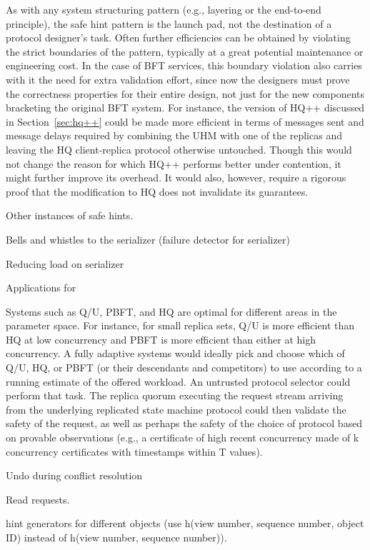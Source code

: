 \documentclass[twocolumn,10pt]{article}
\begin{document}
 As with any system structuring pattern
(e.g., layering or the end-to-end principle), the safe hint pattern is
the launch pad, not the destination of a protocol designer's task.
Often further efficiencies can be obtained by violating the strict
boundaries of the pattern, typically at a great potential maintenance or
engineering cost.  In the case of BFT services, this boundary violation
also carries with it the need for extra validation effort, since now the
designers must prove the correctness properties for their entire design,
not just for the new components bracketing the original BFT system.  For
instance, the version of HQ++ discussed in Section~\ref{sec:hq++} could
be made more efficient in terms of messages sent and message delays
required by combining the UHM with one of the replicas and leaving the
HQ client-replica protocol otherwise untouched.  Though this would not
change the reason for which HQ++ performs better under contention, it
might further improve its overhead.  It would also, however, require a
rigorous proof that the modification to HQ does not invalidate its
guarantees.


 Other instances of safe hints.

Bells and whistles to the serializer (failure detector for
serializer)

Reducing load on serializer

Applications for \bihq

Systems such as Q/U, PBFT, and HQ are optimal for different areas
in the parameter space. For instance, for small replica sets, Q/U is
more efficient than HQ at low concurrency and PBFT is more efficient
than either at high concurrency. A fully adaptive systems would ideally
pick and choose which of Q/U, HQ, or PBFT (or their descendants and
competitors) to use according to a running estimate of the offered
workload. An untrusted protocol selector could perform that task. The
replica quorum executing the request stream arriving from the underlying
replicated state machine protocol could then validate the safety of the
request, as well as perhaps the safety of the choice of protocol based
on provable observations (e.g., a certificate of high recent concurrency
made of k concurrency certificates with timestamps within T values).

Undo during conflict resolution

Read requests.

hint generators for different objects (use h(view number, sequence
number, object ID) instead of h(view number, sequence number)).
\end{document}
